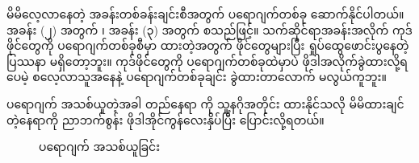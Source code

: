 မိမိလေ့လာနေတဲ့ အခန်းတစ်ခန်းချင်းစီအတွက် ပရောဂျက်တစ်ခု ဆောက်နိုင်ပါတယ်။ အခန်း (၂) အတွက်  ၊ အခန်း (၃) အတွက်  စသည်ဖြင့်။  သက်ဆိုင်ရာအခန်းအလိုက် ကုဒ်ဖိုင်တွေကို ပရောဂျက်တစ်ခုစီမှာ ထားတဲ့အတွက် ဖိုင်တွေများပြီး ရှုပ်ထွေဖောင်းပွနေတဲ့ ပြဿနာ မရှိတော့ဘူး။ ကုဒ်ဖိုင်တွေကို ပရောဂျက်တစ်ခုထဲမှာပဲ ဖိုဒါအလိုက်ခွဲထားလို့ရပေမဲ့ စလေ့လာသူအနေနဲ့ ပရောဂျက်တစ်ခုချင်း ခွဲထားတာလောက် မလွယ်ကူဘူး။

ပရောဂျက် အသစ်ယူတဲ့အခါ တည်နေရာ  ကို သူ့နဂိုအတိုင်း ထားနိုင်သလို မိမိထားချင်တဲ့နေရာကို ညာဘက်စွန်း ဖိုဒါအိုင်ကွန်လေးနှိပ်ပြီး ပြောင်းလို့ရတယ်။

\begin{figure}[tb!]
\caption{ပရောဂျက် အသစ်ယူခြင်း} 
\label{fig:new_proj}
\end{figure}

